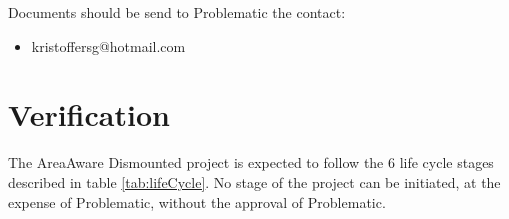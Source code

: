 \noindent Documents should be send to Problematic the contact:
\begin{itemize}
	\item kristoffersg@hotmail.com
\end{itemize}


\chapter{Verification}
The AreaAware Dismounted project is expected to follow the 6 life cycle stages described in table \ref{tab:lifeCycle}.
No stage of the project can be initiated, at the expense of Problematic, without the approval of Problematic.

